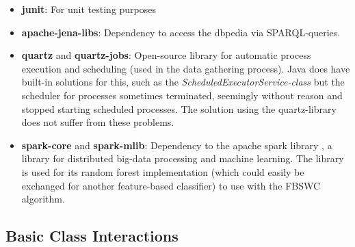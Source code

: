 \begin{itemize}
	\item \textbf{junit}: For unit testing purposes
	\item \textbf{apache-jena-libs}: Dependency to access the dbpedia via SPARQL-queries.
	\item \textbf{quartz} and \textbf{quartz-jobs}: Open-source library for automatic process execution and scheduling (used in the data gathering process). Java does have built-in solutions for this, such as the \textit{ScheduledExecutorService-class} but the scheduler for processes sometimes terminated, seemingly without reason and stopped starting scheduled processes. The solution using the quartz-library does not suffer from these problems.
	\item \textbf{spark-core} and \textbf{spark-mlib}: Dependency to the apache spark library \cite{meng2016mllib}, a library for distributed big-data processing and machine learning. The library is used for its random forest implementation (which could easily be exchanged for another feature-based classifier) to use with the FBSWC algorithm.
\end{itemize}

\subsection{Basic Class Interactions}

